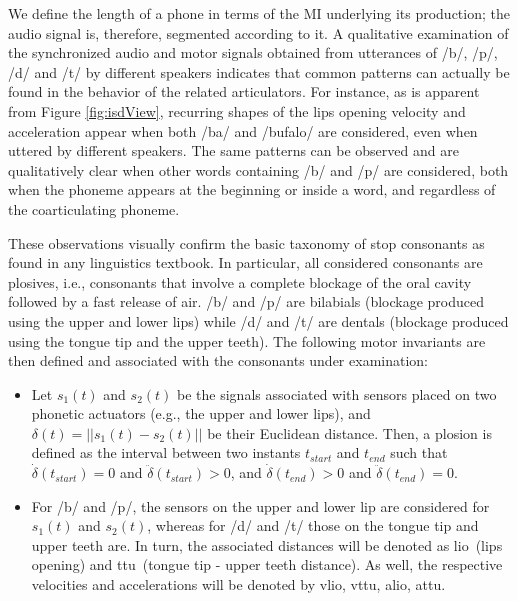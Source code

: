 \documentclass[10pt]{article}
\newcommand{\lio}{\textsf{lio}}
\newcommand{\ttu}{\textsf{ttu}}
\newcommand{\vlio}{\textsf{vlio}}
\newcommand{\vttu}{\textsf{vttu}}
\newcommand{\alio}{\textsf{alio}}
\newcommand{\attu}{\textsf{attu}}
\begin{document}
We define the length of a phone in terms of the MI underlying its production;
the audio signal is, therefore, segmented according to it.
A qualitative examination of the synchronized audio and motor
signals obtained from utterances of /b/, /p/, /d/ and /t/
by different speakers indicates that common patterns can
actually be found in the behavior of the related articulators.
For instance, as is apparent from Figure \ref{fig:isdView}, 
recurring shapes of the lips opening velocity and acceleration appear
when both /ba/ and /bufalo/ are considered, even when uttered by different
speakers. The same patterns can be observed and are qualitatively clear when other
words containing /b/ and /p/ are considered, both when the phoneme appears at the
beginning or inside a word, and regardless of the coarticulating phoneme.

These observations visually confirm the basic taxonomy of stop consonants 
as found in any linguistics textbook. In particular, all considered consonants are plosives,
i.e., consonants that involve a complete blockage of the oral cavity followed by a fast
release of air. /b/ and /p/ are bilabials (blockage produced using the upper and lower lips)
while /d/ and /t/ are dentals (blockage produced using the tongue tip and the upper teeth).
The following motor invariants are then defined and associated with the consonants under
examination:

\begin{itemize}

  \item Let $s_1(t)$ and $s_2(t)$ be the signals associated
    with sensors placed on two phonetic actuators (e.g., the upper and
    lower lips), and $\delta(t) = ||s_1(t)-s_2(t)||$ be their
    Euclidean distance. Then, a plosion is defined as the interval
    between two instants $t_{start}$ and $t_{end}$ such that
    $\dot{\delta}(t_{start}) = 0 $ and $\ddot{\delta}(t_{start}) > 0$,
    and $\dot{\delta}(t_{end}) > 0 $ and $\ddot{\delta}(t_{end}) = 0$.

  \item For /b/ and /p/, the sensors on the upper and lower
    lip are considered for $s_1(t)$ and $s_2(t)$, whereas for /d/ and /t/
    those on the tongue tip and upper teeth are. In turn, the associated
    distances will be denoted as \lio\ (lips opening) and \ttu\
    (tongue tip - upper teeth distance). As well, the respective velocities
    and accelerations will be denoted by \vlio, \vttu, \alio, \attu.

\end{itemize}
\end{document}

